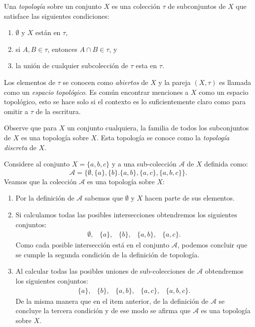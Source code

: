\begin{definition}\label{def:topologia}
Una \textit{topología} sobre un conjunto $X$ es una colección $\tau$ de subconjuntos de $X$ que satisface las siguientes condiciones:
\begin{enumerate}
    \item $\emptyset$ y $X$ están en $\tau$,
    \item si $A,B\in\tau$, entonces $A\cap B\in\tau$, y 
    \item la unión de cualquier subcolección de $\tau$ esta en $\tau$.
\end{enumerate}
Los elementos de $\tau$ se conocen como \textit{abiertos} de $X$ y la pareja $(X,\tau)$ es llamada como un \textit{espacio topológico}. Es común encontrar menciones a $X$ como un espacio topológico, esto se hace solo si el contexto es lo suficientemente claro como para omitir a $\tau$ de la escritura.
\end{definition}

\begin{example}\label{ex:topologíaDiscreta} 
Observe que para $X$ un conjunto cualquiera, la familia de todos los subconjuntos de $X$ es una topología sobre $X$. Esta topología se conoce como la \textit{topología discreta} de $X$.
\end{example}

\begin{example}\label{ex:exBase}
Considere al conjunto $X=\{a,b,c\}$ y a una sub-colección $\mathcal{A}$ de $X$ definida como: 
$$\mathcal{A}=\{\emptyset,\{a\},\{b\}.\{a,b\},\{a,c\},\{a,b,c\}\}.$$
Veamos que la colección $\mathcal{A}$ es una topología sobre $X$:
\begin{enumerate}
    \item Por la definición de $\mathcal{A}$ sabemos que $\emptyset$ y $X$ hacen parte de sus elementos.
    \item Si calculamos todas las posibles intersecciones obtendremos los siguientes conjuntos:
    $$\begin{array}{cccccc}
        \emptyset, & \{a\}, & \{b\}, & \{a,b\}, & \{a,c\}.
    \end{array}$$
    Como cada posible intersección está en el conjunto $\mathcal{A}$, podemos concluir que se cumple la segunda condición de la definición de topología.
    \item Al calcular todas las posibles uniones de sub-colecciones de $\mathcal{A}$ obtendremos los siguientes conjuntos:
    $$\begin{array}{cccccc}
        \{a\}, & \{b\}, & \{a,b\}, & \{a,c\}, & \{a,b,c\}.
    \end{array}$$
    De la misma manera que en el item anterior, de la definición de $\mathcal{A}$ se concluye la tercera condición y de ese modo se afirma que $\mathcal{A}$ es una topología sobre $X$.
\end{enumerate}
\end{example}

